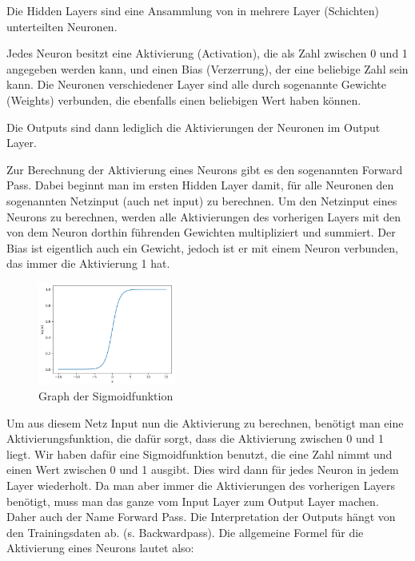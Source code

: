 \documentclass{scrartcl}
\begin{document}
	Die Hidden Layers sind eine Ansammlung von in mehrere Layer (Schichten) unterteilten Neuronen.
	
	Jedes Neuron besitzt eine Aktivierung (Activation), die als Zahl zwischen 0 und 1 angegeben werden kann, und einen Bias (Verzerrung), der eine beliebige Zahl sein kann. Die Neuronen verschiedener Layer sind alle durch sogenannte Gewichte (Weights) verbunden, die ebenfalls einen beliebigen Wert haben können.

	Die Outputs sind dann lediglich die Aktivierungen der Neuronen im Output Layer.


	Zur Berechnung der Aktivierung eines Neurons gibt es den sogenannten Forward Pass. Dabei beginnt man im ersten Hidden Layer damit, für alle Neuronen den sogenannten Netzinput (auch net input) zu berechnen. Um den Netzinput eines Neurons zu berechnen, werden alle Aktivierungen des vorherigen Layers mit den von dem Neuron dorthin führenden Gewichten multipliziert und summiert. Der Bias ist eigentlich auch ein Gewicht, jedoch ist er mit einem Neuron verbunden, das immer die Aktivierung 1 hat.

	\begin{figure}
		\centering
		\includegraphics[width=0.4\textwidth]{pictures/sig_func.png}
		\caption{Graph der Sigmoidfunktion}
		\label{sig_func}
	\end{figure}

	Um aus diesem Netz Input nun die Aktivierung zu berechnen, benötigt man eine Aktivierungsfunktion, die dafür sorgt, dass die Aktivierung zwischen 0 und 1 liegt. Wir haben dafür eine Sigmoidfunktion benutzt, die eine Zahl nimmt und einen Wert zwischen 0 und 1 ausgibt. Dies wird dann für jedes Neuron in jedem Layer wiederholt. Da man aber immer die Aktivierungen des vorherigen Layers benötigt, muss man das ganze vom Input Layer zum Output Layer machen. Daher auch der Name Forward Pass. Die Interpretation der Outputs hängt von den Trainingsdaten ab. (s. Backwardpass). Die allgemeine Formel für die Aktivierung eines Neurons lautet also:
\end{document}
